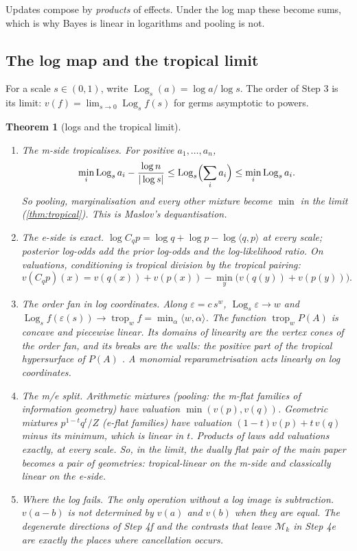 \documentclass[11pt]{article}
\newtheorem{theorem}{Theorem}\newtheorem{proposition}[theorem]{Proposition}\newtheorem{lemma}[theorem]{Lemma}\newtheorem{corollary}[theorem]{Corollary}\newtheorem{conjecture}[theorem]{Conjecture}
\theoremstyle{definition}\newtheorem{definition}[theorem]{Definition}\newtheorem{remark}[theorem]{Remark}\newtheorem{example}[theorem]{Example}
\begin{document}
Updates compose by \emph{products} of effects. Under the log map these become sums, which is why Bayes is linear in logarithms and pooling
is not.

\subsection{The log map and the tropical limit}
For a scale $s\in(0,1)$, write $\operatorname{Log}_s(a)=\log a/\log s$. The order of Step 3 is its limit: $v(f)=\lim_{s\to0}\operatorname{Log}_sf(s)$ for germs asymptotic
to powers.

\begin{theorem}[logs and the tropical limit]\label{thm:logtrop}
\begin{enumerate}
\item[(1)] \emph{The m-side tropicalises.} For positive $a_1,\dots,a_n$,
  \[
  \min_i\operatorname{Log}_sa_i-\frac{\log n}{|\log s|}\le\operatorname{Log}_s\Bigl(\sum_ia_i\Bigr)\le\min_i\operatorname{Log}_sa_i .
  \]
  So pooling, marginalisation and every other mixture become $\min$ in the limit (\cref{thm:tropical}). This is Maslov's dequantisation.
\item[(2)] \emph{The e-side is exact.} $\log C_qp=\log q+\log p-\log\langle q,p\rangle$ at every scale; posterior log-odds add the prior log-odds and the
  log-likelihood ratio. On valuations, conditioning is tropical division by the tropical pairing:
  \[
  v(C_qp)(x)=v(q(x))+v(p(x))-\min_y\bigl(v(q(y))+v(p(y))\bigr).
  \]
\item[(3)] \emph{The order fan in log coordinates.} Along $\varepsilon=c\,s^w$, $\operatorname{Log}_s\varepsilon\to w$ and $\operatorname{Log}_sf(\varepsilon(s))\to\operatorname{trop}_wf=\min_\alpha\langle w,\alpha\rangle$. The
  function $\operatorname{trop}_wP(A)$ is concave and piecewise linear. Its domains of linearity are the vertex cones of the order fan, and its breaks are the
  walls: the positive part of the tropical hypersurface of $P(A)$ \cite{MaclaganSturmfels2015}. A monomial reparametrisation acts linearly on log
  coordinates.
\item[(4)] \emph{The m/e split.} Arithmetic mixtures (pooling: the m-flat families of information geometry) have valuation $\min(v(p),v(q))$.
  Geometric mixtures $p^{1-t}q^t/Z$ (e-flat families) have valuation $(1-t)v(p)+t\,v(q)$ minus its minimum, which is linear in $t$. Products of laws
  add valuations exactly, at every scale. So, in the limit, the dually flat pair of the main paper \cite{AmariNagaoka2000} becomes a pair of
  geometries: tropical-linear on the m-side and classically linear on the e-side.
\item[(5)] \emph{Where the log fails.} The only operation without a log image is subtraction. $v(a-b)$ is not determined by $v(a)$ and $v(b)$
  when they are equal. The degenerate directions of Step 4f and the contrasts that leave $\mathcal M_k$ in Step 4e are exactly the places where
  cancellation occurs.
\end{enumerate}
\end{theorem}
\end{document}
